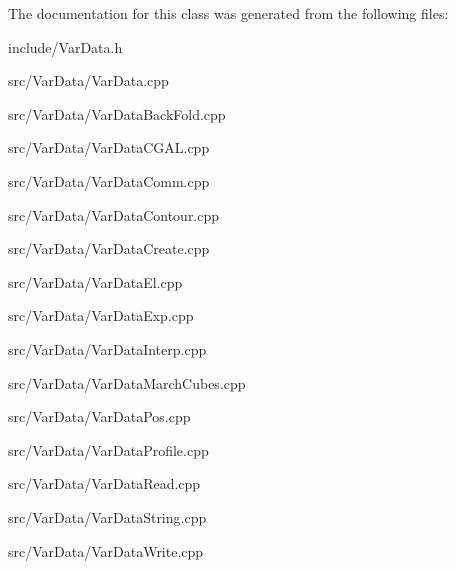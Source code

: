 \-The documentation for this class was generated from the following files\-:\begin{DoxyCompactItemize}
\item 
include/\-Var\-Data.\-h\item 
src/\-Var\-Data/\-Var\-Data.\-cpp\item 
src/\-Var\-Data/\-Var\-Data\-Back\-Fold.\-cpp\item 
src/\-Var\-Data/\-Var\-Data\-C\-G\-A\-L.\-cpp\item 
src/\-Var\-Data/\-Var\-Data\-Comm.\-cpp\item 
src/\-Var\-Data/\-Var\-Data\-Contour.\-cpp\item 
src/\-Var\-Data/\-Var\-Data\-Create.\-cpp\item 
src/\-Var\-Data/\-Var\-Data\-El.\-cpp\item 
src/\-Var\-Data/\-Var\-Data\-Exp.\-cpp\item 
src/\-Var\-Data/\-Var\-Data\-Interp.\-cpp\item 
src/\-Var\-Data/\-Var\-Data\-March\-Cubes.\-cpp\item 
src/\-Var\-Data/\-Var\-Data\-Pos.\-cpp\item 
src/\-Var\-Data/\-Var\-Data\-Profile.\-cpp\item 
src/\-Var\-Data/\-Var\-Data\-Read.\-cpp\item 
src/\-Var\-Data/\-Var\-Data\-String.\-cpp\item 
src/\-Var\-Data/\-Var\-Data\-Write.\-cpp\end{DoxyCompactItemize}
